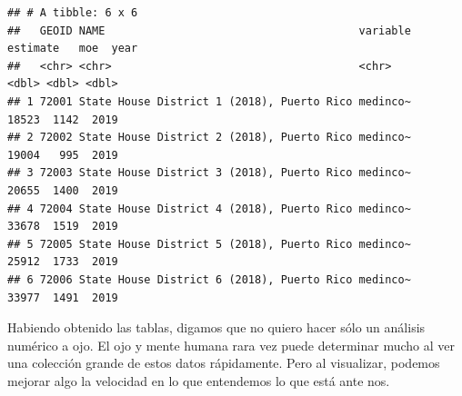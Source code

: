 \documentclass[
]{article}
\begin{document}
\begin{verbatim}
## # A tibble: 6 x 6
##   GEOID NAME                                       variable estimate   moe  year
##   <chr> <chr>                                      <chr>       <dbl> <dbl> <dbl>
## 1 72001 State House District 1 (2018), Puerto Rico medinco~    18523  1142  2019
## 2 72002 State House District 2 (2018), Puerto Rico medinco~    19004   995  2019
## 3 72003 State House District 3 (2018), Puerto Rico medinco~    20655  1400  2019
## 4 72004 State House District 4 (2018), Puerto Rico medinco~    33678  1519  2019
## 5 72005 State House District 5 (2018), Puerto Rico medinco~    25912  1733  2019
## 6 72006 State House District 6 (2018), Puerto Rico medinco~    33977  1491  2019
\end{verbatim}

Habiendo obtenido las tablas, digamos que no quiero hacer sólo un
análisis numérico a ojo. El ojo y mente humana rara vez puede determinar
mucho al ver una colección grande de estos datos rápidamente. Pero al
visualizar, podemos mejorar algo la velocidad en lo que entendemos lo
que está ante nos.
\end{document}

